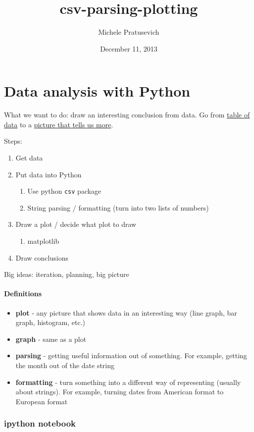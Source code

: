 \documentclass[letterpaper,10pt,english]{/usr/local/lib/python2.7/dist-packages/sphinx/texinputs/sphinxhowto}
\title{csv-parsing-plotting}
\date{December 11, 2013}
\author{Michele Pratusevich}
\begin{document}
        
            \maketitle
        

        


        
        \section{Data analysis with Python}

What we want to do: draw an interesting conclusion from data. Go from
\href{http://www.amstat.org/publications/jse/datasets/30oysters.dat.txt}{table
of data} to a
\href{https://github.com/meet-projects/sample-YL1-individual-project/blob/master/oyster\_with\_titles.png}{picture
that tells us more}.

Steps:

\begin{enumerate}[1.]
\item
  Get data
\item
  Put data into Python
  \begin{enumerate}[1.]
  \item
    Use python \texttt{csv} package
  \item
    String parsing / formatting (turn into two lists of numbers)
  \end{enumerate}
\item
  Draw a plot / decide what plot to draw
  \begin{enumerate}[1.]
  \item
    matplotlib
  \end{enumerate}
\item
  Draw conclusions
\end{enumerate}
Big ideas: iteration, planning, big picture\paragraph{Definitions}

\begin{itemize}
\item
  \textbf{plot} - any picture that shows data in an interesting way
  (line graph, bar graph, histogram, etc.)
\item
  \textbf{graph} - same as a plot
\item
  \textbf{parsing} - getting useful information out of something. For
  example, getting the month out of the date string
\item
  \textbf{formatting} - turn something into a different way of
  representing (usually about strings). For example, turning dates from
  American format to European format
\end{itemize}\subsubsection{ipython notebook}
\end{document}
